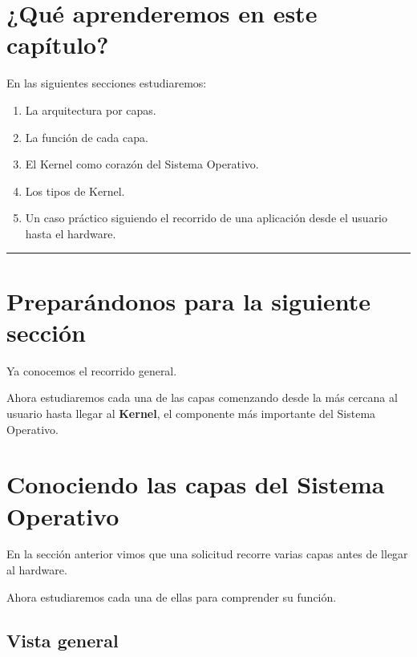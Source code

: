 \documentclass[
  spanish,
  letterpaper,
]{scrbook}
\providecommand{\tightlist}{%
  \setlength{\itemsep}{0pt}\setlength{\parskip}{0pt}}
\begin{document}

\chapter{¿Qué aprenderemos en este
capítulo?}\label{quuxe9-aprenderemos-en-este-capuxedtulo-1}

En las siguientes secciones estudiaremos:

\begin{enumerate}
\def\labelenumi{\arabic{enumi}.}
\tightlist
\item
  La arquitectura por capas.
\item
  La función de cada capa.
\item
  El Kernel como corazón del Sistema Operativo.
\item
  Los tipos de Kernel.
\item
  Un caso práctico siguiendo el recorrido de una aplicación desde el
  usuario hasta el hardware.
\end{enumerate}

\begin{center}\rule{0.5\linewidth}{0.5pt}\end{center}


\chapter{Preparándonos para la siguiente
sección}\label{preparuxe1ndonos-para-la-siguiente-secciuxf3n-1}

Ya conocemos el recorrido general.

Ahora estudiaremos cada una de las capas comenzando desde la más cercana
al usuario hasta llegar al \textbf{Kernel}, el componente más importante
del Sistema Operativo.


\chapter{Conociendo las capas del Sistema
Operativo}\label{conociendo-las-capas-del-sistema-operativo}

En la sección anterior vimos que una solicitud recorre varias capas
antes de llegar al hardware.

Ahora estudiaremos cada una de ellas para comprender su función.

\section{Vista general}\label{vista-general}
\end{document}

